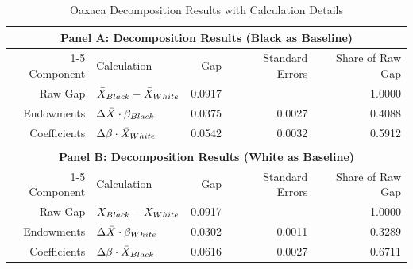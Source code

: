 \begin{table}[ht]
\centering
\caption{Oaxaca Decomposition Results with Calculation Details}
\begin{tabular}{rlrrr}
  \toprule
  \multicolumn{5}{c}{\textbf{Panel A: Decomposition Results (Black as Baseline)}} \\
  \cmidrule(lr){1-5}
  Component & Calculation & Gap & Standard Errors & Share of Raw Gap \\ 
  \midrule
  Raw Gap & $\Bar{X}_{Black} - \Bar{X}_{White}$ & 0.0917 &  & 1.0000 \\ 
  Endowments & $\Delta \Bar{X} \cdot \beta_{Black}$ & 0.0375 & 0.0027 & 0.4088 \\ 
  Coefficients & $\Delta \beta \cdot \Bar{X}_{White}$ & 0.0542 & 0.0032 & 0.5912 \\ 
  \bottomrule
  \\
  \toprule
  \multicolumn{5}{c}{\textbf{Panel B: Decomposition Results (White as Baseline)}} \\
  \cmidrule(lr){1-5}
  Component & Calculation & Gap & Standard Errors & Share of Raw Gap \\ 
  \midrule
  Raw Gap & $\Bar{X}_{Black} - \Bar{X}_{White}$ & 0.0917 &  & 1.0000 \\ 
  Endowments & $\Delta \Bar{X} \cdot \beta_{White}$ & 0.0302 & 0.0011 & 0.3289 \\ 
  Coefficients & $\Delta \beta \cdot \Bar{X}_{Black}$ & 0.0616 & 0.0027 & 0.6711 \\ 
  \bottomrule
\end{tabular}
\end{table}